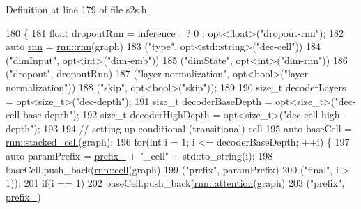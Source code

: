 Definition at line 179 of file s2s.\+h.


\begin{DoxyCode}
180                                                            \{
181   \textcolor{keywordtype}{float} dropoutRnn = \hyperlink{classmarian_1_1DecoderBase_a808975d515f60a53096f6794c3dc61d4}{inference\_} ? 0 : opt<float>(\textcolor{stringliteral}{"dropout-rnn"});
182   \textcolor{keyword}{auto} \hyperlink{namespacemarian_1_1rnn_aff1b115e415945b445f8d4a2068ec3e8}{rnn} = \hyperlink{namespacemarian_1_1rnn_aff1b115e415945b445f8d4a2068ec3e8}{rnn::rnn}(graph)
183              (\textcolor{stringliteral}{"type"}, opt<std::string>(\textcolor{stringliteral}{"dec-cell"}))
184              (\textcolor{stringliteral}{"dimInput"}, opt<int>(\textcolor{stringliteral}{"dim-emb"}))
185              (\textcolor{stringliteral}{"dimState"}, opt<int>(\textcolor{stringliteral}{"dim-rnn"}))
186              (\textcolor{stringliteral}{"dropout"}, dropoutRnn)
187              (\textcolor{stringliteral}{"layer-normalization"}, opt<bool>(\textcolor{stringliteral}{"layer-normalization"}))
188              (\textcolor{stringliteral}{"skip"}, opt<bool>(\textcolor{stringliteral}{"skip"}));
189 
190   \textcolor{keywordtype}{size\_t} decoderLayers = opt<size\_t>(\textcolor{stringliteral}{"dec-depth"});
191   \textcolor{keywordtype}{size\_t} decoderBaseDepth = opt<size\_t>(\textcolor{stringliteral}{"dec-cell-base-depth"});
192   \textcolor{keywordtype}{size\_t} decoderHighDepth = opt<size\_t>(\textcolor{stringliteral}{"dec-cell-high-depth"});
193 
194   \textcolor{comment}{// setting up conditional (transitional) cell}
195   \textcolor{keyword}{auto} baseCell = \hyperlink{namespacemarian_1_1rnn_a55385034d5ad19187245bb2b564cb7eb}{rnn::stacked\_cell}(graph);
196   \textcolor{keywordflow}{for}(\textcolor{keywordtype}{int} i = 1; i <= decoderBaseDepth; ++i) \{
197     \textcolor{keyword}{auto} paramPrefix = \hyperlink{classmarian_1_1DecoderBase_a043a90801b6bda9a45e309607136e947}{prefix\_} + \textcolor{stringliteral}{"\_cell"} + std::to\_string(i);
198     baseCell.push\_back(\hyperlink{namespacemarian_1_1rnn_af723e51535e0b11de5b28fe19627a3fb}{rnn::cell}(graph)
199                        (\textcolor{stringliteral}{"prefix"}, paramPrefix)
200                        (\textcolor{stringliteral}{"final"}, i > 1));
201     \textcolor{keywordflow}{if}(i == 1)
202       baseCell.push\_back(\hyperlink{namespacemarian_1_1rnn_a57316dc4c756edb2a8dfabea7e50d92b}{rnn::attention}(graph)
203                          (\textcolor{stringliteral}{"prefix"}, \hyperlink{classmarian_1_1DecoderBase_a043a90801b6bda9a45e309607136e947}{prefix\_})

\end{DoxyCode}
